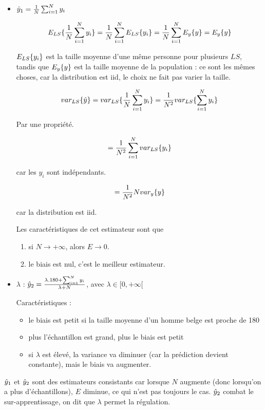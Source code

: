 	\begin{itemize}
		\item $\hat{y}_1 = \frac{1}{N} \sum_{i = 1}^N y_i$
		
		$$E_{LS}\{\frac{1}{N} \sum_{i = 1}^N y_i\} = \frac{1}{N} \sum_{i = 1}^N E_{LS}\{y_i\} = \frac{1}{N} \sum_{i = 1}^N E_y\{y\} = E_y\{y\}$$
		
		$E_{LS}\{y_i\}$ est la taille moyenne d'une même personne pour plusieurs $LS$, tandis que $E_y\{y\}$ est la taille moyenne de la population : ce sont les mêmes choses, car la distribution est iid, le choix ne fait pas varier la taille.
		
		$$var_{LS}\{\hat{y}\} = var_{LS}\{\frac{1}{N} \sum_{i = 1}^N y_i\} = \frac{1}{N^2} var_{LS}\{\sum_{i = 1}^N y_i\}$$
		
		Par une propriété.
		
		$$= \frac{1}{N^2} \sum_{i = 1}^N var_{LS}\{y_i\}$$
		
		car les $y_i$ sont indépendants.
		
		$$= \frac{1}{N^2} N var_y\{y\}$$
		
		car la distribution est iid.
		
		Les caractéristiques de cet estimateur sont que
		
		\begin{enumerate}
			\item si $N \rightarrow + \infty$, alors $E \rightarrow 0$.
			\item le biais est nul, c'est le meilleur estimateur.			
		\end{enumerate}
		
		\item $\lambda$ : $\hat{y}_2 = \frac{\lambda . 180 + \sum_{i = 1}^N y_i}{\lambda + N}$, avec $\lambda \in [ 0, +\infty [ $
		
		Caractéristiques :
		
		\begin{itemize}
			\item le biais est petit si la taille moyenne d'un homme belge est proche de 180
			\item plus l'échantillon est grand, plus le biais est petit
			\item si $\lambda$ est élevé, la variance va diminuer (car la prédiction devient constante), mais le biais va augmenter.
		\end{itemize}
	\end{itemize}
	
	$\hat{y}_1$ et $\hat{y}_2$ sont des estimateurs consistants car lorsque $N$ augmente (donc lorsqu'on a plus d'échantillons), $E$ diminue, ce qui n'est pas toujours le cas. $\hat{y}_2$ combat le sur-apprentissage, on dit que $\lambda$ permet la régulation.
